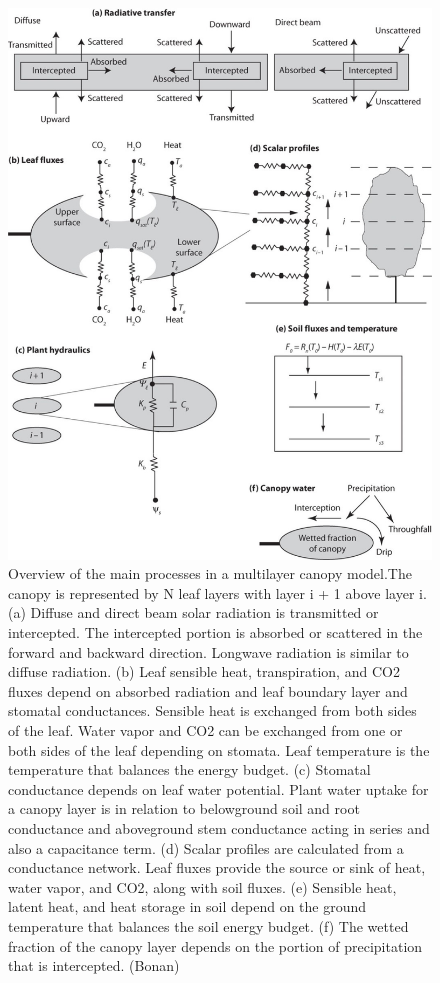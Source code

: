 \documentclass[12pt,oneside]{book}
\begin{document}
\begin{figure}

{\centering \includegraphics[width=0.8\linewidth]{figures/chap3/f325_multilayer_process} 

}

\caption{Overview of the main processes in a multilayer canopy model.The canopy is represented by N leaf layers with layer i + 1 above layer i. (a) Diffuse and direct beam solar radiation is transmitted or intercepted. The intercepted portion is absorbed or scattered in the forward and backward direction. Longwave radiation is similar to diffuse radiation. (b) Leaf sensible heat, transpiration, and CO2 fluxes depend on absorbed radiation and leaf boundary layer and stomatal conductances. Sensible heat is exchanged from both sides of the leaf. Water vapor and CO2 can be exchanged from one or both sides of the leaf depending on stomata. Leaf temperature is the temperature that balances the energy budget. (c) Stomatal conductance depends on leaf water potential. Plant water uptake for a canopy layer is in relation to belowground soil and root conductance and aboveground stem conductance acting in series and also a capacitance term. (d) Scalar profiles are calculated from a conductance network. Leaf fluxes provide the source or sink of heat, water vapor, and CO2, along with soil fluxes. (e) Sensible heat, latent heat, and heat storage in soil depend on the ground temperature that balances the soil energy budget. (f) The wetted fraction of the canopy layer depends on the portion of precipitation that is intercepted. (Bonan)}\label{fig:f325}
\end{figure}
\end{document}
